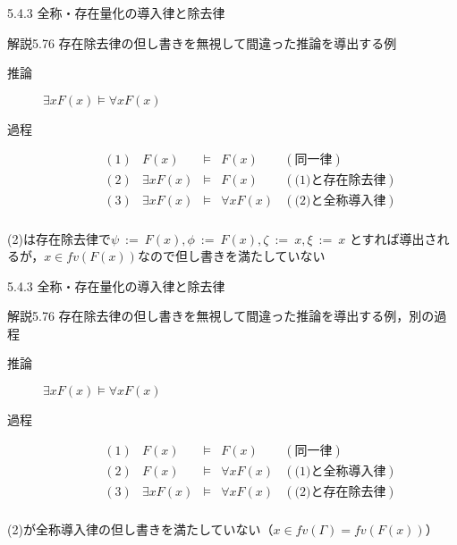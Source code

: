 \documentclass[dvipdfmx,11pt]{beamer}
\begin{document}
\begin{frame}{5.4.3 全称・存在量化の導入律と除去律}
  \begin{block}{解説5.76}
    存在除去律の但し書きを無視して間違った推論を導出する例

    \begin{description}
    \item [推論] \(\exists x F(x) \vDash \forall x F(x) \)
    \item [過程]
      \[
      \begin{array}{rrcll}
        (1) & F(x) & \vDash & F(x) & (\textit{同一律}) \\
        (2) & \exists x F(x) & \vDash & F(x) & (\textit{(1)と存在除去律}) \\
        (3) & \exists x F(x) & \vDash & \forall x F(x) & (\textit{(2)と全称導入律}) \\
      \end{array}
      \]
    \end{description}

    (2)は存在除去律で\(\psi \ := \ F(x), \phi \ := \ F(x), \zeta \ := \ x, \xi \ := \ x\)
    とすれば導出されるが，\(x\in\textit{fv}(F(x))\)なので但し書きを満たしていない
  \end{block}
\end{frame}

\begin{frame}{5.4.3 全称・存在量化の導入律と除去律}
  \begin{block}{解説5.76}
    存在除去律の但し書きを無視して間違った推論を導出する例，別の過程

    \begin{description}
    \item [推論] \(\exists x F(x) \vDash \forall x F(x) \)
    \item [過程]
      \[
      \begin{array}{rrcll}
        (1) & F(x) & \vDash & F(x) & (\textit{同一律}) \\
        (2) & F(x) & \vDash & \forall x F(x) & (\textit{(1)と全称導入律}) \\
        (3) & \exists x F(x) & \vDash & \forall x F(x) & (\textit{(2)と存在除去律}) \\
      \end{array}
      \]
    \end{description}

    (2)が全称導入律の但し書きを満たしていない（\(x\in\textit{fv}(\Gamma)=\textit{fv}(F(x))\)）
  \end{block}
\end{frame}
\end{document}
